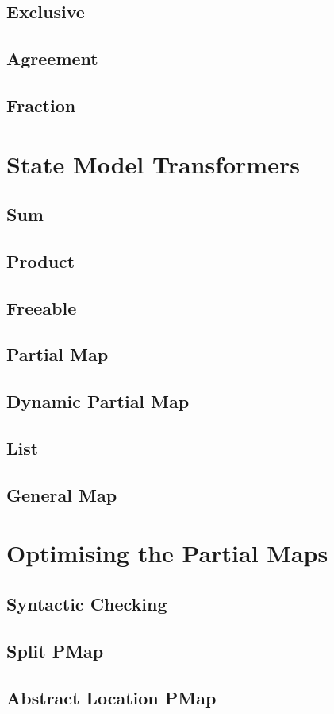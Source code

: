 \subsection{Exclusive}

\subsection{Agreement}

\subsection{Fraction}

\section{State Model Transformers}

\subsection{Sum}

\subsection{Product}

\subsection{Freeable}

\subsection{Partial Map}

\subsection{Dynamic Partial Map}

\subsection{List}

\subsection{General Map}

\section{Optimising the Partial Maps}

\subsection{Syntactic Checking}

\subsection{Split PMap}

\subsection{Abstract Location PMap}





